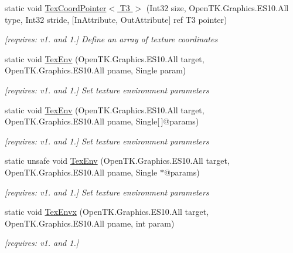 \begin{DoxyCompactItemize}
static void \hyperlink{class_open_t_k_1_1_graphics_1_1_e_s10_1_1_g_l_a73bab9720a6c7e2fbeff17cfaa1b4dcd}{Tex\-Coord\-Pointer$<$ T3 $>$} (Int32 size, Open\-T\-K.\-Graphics.\-E\-S10.\-All type, Int32 stride, \mbox{[}In\-Attribute, Out\-Attribute\mbox{]} ref T3 pointer)
\begin{DoxyCompactList}\small\item\em \mbox{[}requires\-: v1. and 1.\mbox{]} Define an array of texture coordinates \end{DoxyCompactList}\item 
static void \hyperlink{class_open_t_k_1_1_graphics_1_1_e_s10_1_1_g_l_af9ffebfd64521b19bf7c6420694a81b4}{Tex\-Env} (Open\-T\-K.\-Graphics.\-E\-S10.\-All target, Open\-T\-K.\-Graphics.\-E\-S10.\-All pname, Single param)
\begin{DoxyCompactList}\small\item\em \mbox{[}requires\-: v1. and 1.\mbox{]} Set texture environment parameters \end{DoxyCompactList}\item 
static void \hyperlink{class_open_t_k_1_1_graphics_1_1_e_s10_1_1_g_l_af3964462a5e461946cc0815615f105ff}{Tex\-Env} (Open\-T\-K.\-Graphics.\-E\-S10.\-All target, Open\-T\-K.\-Graphics.\-E\-S10.\-All pname, Single\mbox{[}$\,$\mbox{]}@params)
\begin{DoxyCompactList}\small\item\em \mbox{[}requires\-: v1. and 1.\mbox{]} Set texture environment parameters \end{DoxyCompactList}\item 
static unsafe void \hyperlink{class_open_t_k_1_1_graphics_1_1_e_s10_1_1_g_l_a49f08b09657602619c29e2ada2f868c3}{Tex\-Env} (Open\-T\-K.\-Graphics.\-E\-S10.\-All target, Open\-T\-K.\-Graphics.\-E\-S10.\-All pname, Single $\ast$@params)
\begin{DoxyCompactList}\small\item\em \mbox{[}requires\-: v1. and 1.\mbox{]} Set texture environment parameters \end{DoxyCompactList}\item 
static void \hyperlink{class_open_t_k_1_1_graphics_1_1_e_s10_1_1_g_l_a0f408b11e4e42ba28acc0f58f53ca6a8}{Tex\-Envx} (Open\-T\-K.\-Graphics.\-E\-S10.\-All target, Open\-T\-K.\-Graphics.\-E\-S10.\-All pname, int param)
\begin{DoxyCompactList}\small\item\em \mbox{[}requires\-: v1. and 1.\mbox{]}\end{DoxyCompactList}\item 

\end{DoxyCompactItemize}
